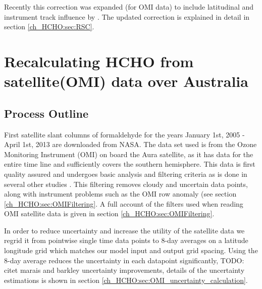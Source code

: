     Recently this correction was expanded (for OMI data) to include latitudinal and instrument track influence by \citet{Abad2015}.
    The updated correction is explained in detail in section \ref{ch_HCHO:sec:RSC}.
    
\section{Recalculating HCHO from satellite(OMI) data over Australia}
\label{ch_HCHO:sec:creatinginventory}

  \subsection{Process Outline}
    First satellite slant columns of formaldehyde for the years January 1st, 2005 - April 1st, 2013 are downloaded from NASA.
    The data set used is from the Ozone Monitoring Instrument (OMI) on board the Aura satellite, as it has data for the entire time line and sufficiently covers the southern hemisphere.
    This data is first quality assured and undergoes basic analysis and filtering criteria as is done in several other studies \citep[eg.]{Marais2012, Barkley2013, Bauwens2016, Zhu2016}.
    This filtering removes cloudy and uncertain data points, along with instrument problems such as the OMI row anomaly (see section \ref{ch_HCHO:sec:OMIFiltering}.
    A full account of the filters used when reading OMI satellite data is given in section \ref{ch_HCHO:sec:OMIFiltering}.
    
    In order to reduce uncertainty and increase the utility of the satellite data we regrid it from pointwise single time data points to 8-day averages on a latitude longitude grid which matches our model input and output grid spacing. 
    Using the 8-day average reduces the uncertainty in each datapoint significantly, TODO: citet marais and barkley uncertainty improvements, details of the uncertainty estimations is shown in section \ref{ch_HCHO:sec:OMI_uncertainty_calculation}.
    
